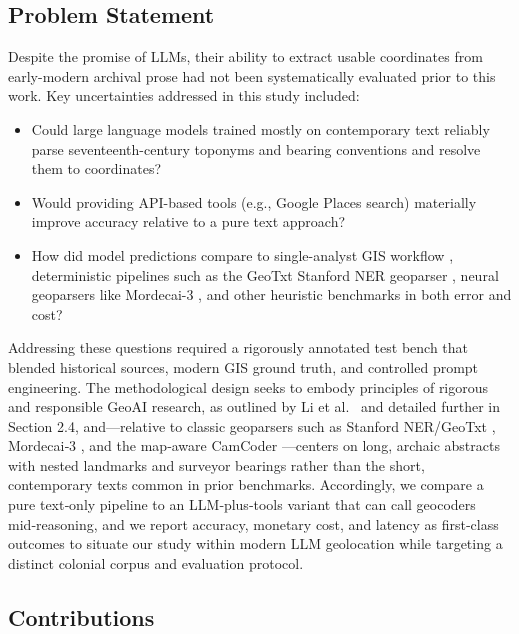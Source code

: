 \subsection{Problem Statement}\label{problem-statement}

Despite the promise of LLMs, their ability to extract usable coordinates
from early-modern archival prose had not been systematically evaluated
prior to this work. Key uncertainties addressed in this study included:

\begin{itemize}
\tightlist
\item
  Could large language models trained mostly on contemporary text
  reliably parse seventeenth-century toponyms and bearing conventions
  and resolve them to coordinates?
\item
  Would providing API-based tools (e.g., Google Places search)
  materially improve accuracy relative to a pure text approach?
\item
  How did model predictions compare to single-analyst GIS workflow
  \citep{Bashorun2025_gis}, deterministic pipelines such as the GeoTxt
  Stanford NER geoparser \citep{karimzadeh2019geotxt}, neural geoparsers
  like Mordecai-3 \citep{halterman2023mordecai}, and other heuristic
  benchmarks in both error and cost?
\end{itemize}

Addressing these questions required a rigorously annotated test bench
that blended historical sources, modern GIS ground truth, and controlled
prompt engineering. The methodological design seeks to embody principles
of rigorous and responsible GeoAI research, as outlined by Li et
al.~\citep{Li2024_geoai} and detailed further in Section 2.4,
and---relative to classic geoparsers such as Stanford NER/GeoTxt
\citep{karimzadeh2019geotxt}, Mordecai‑3 \citep{halterman2023mordecai},
and the map‑aware CamCoder \citep{Gritta2018_camcoder}---centers on
long, archaic abstracts with nested landmarks and surveyor bearings
rather than the short, contemporary texts common in prior benchmarks.
Accordingly, we compare a pure text‑only pipeline to an LLM‑plus‑tools
variant that can call geocoders mid‑reasoning, and we report accuracy,
monetary cost, and latency as first‑class outcomes to situate our study
within modern LLM geolocation while targeting a distinct colonial corpus
and evaluation protocol.

\subsection{Contributions}\label{contributions}

